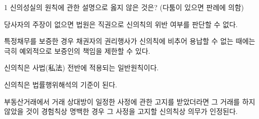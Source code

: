 \begin{question}{1}
신의성실의 원칙에 관한 설명으로 옳지 않은 것은? (다툼이 있으면 판례에 의함)
\begin{choices}
  \item 당사자의 주장이 없으면 법원은 직권으로 신의칙의 위반 여부를 판단할 수 없다.
  \item 특정채무를 보증한 경우 채권자의 권리행사가 신의칙에 비추어 용납할 수 없는 때에는 극히 예외적으로 보증인의 책임을 제한할 수 있다.
  \item 신의칙은 사법(私法) 전반에 적용되는 일반원칙이다.
  \item 신의칙은 법률행위해석의 기준이 된다.
  \item 부동산거래에서 거래 상대방이 일정한 사정에 관한 고지를 받았더라면 그 거래를 하지 않았을 것이 경험칙상 명백한 경우 그 사정을 고지할 신의칙상 의무가 인정된다.
\end{choices}
\end{question}
